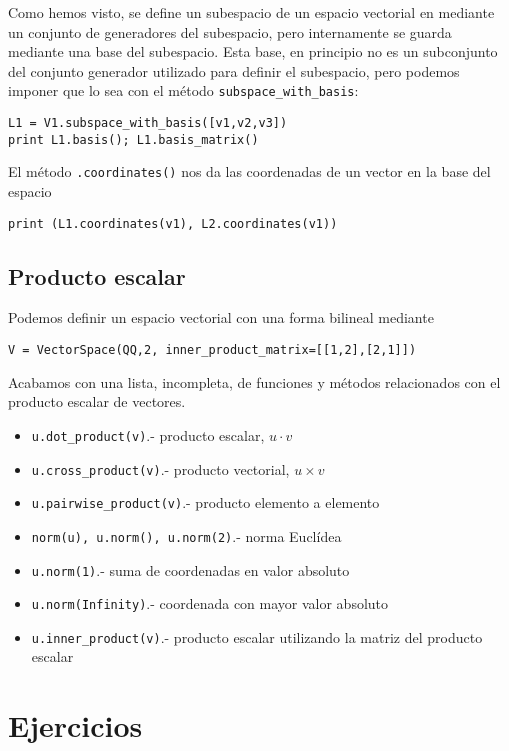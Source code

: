 Como hemos visto, se define un subespacio de un espacio vectorial en {\sage}
mediante un conjunto de generadores del subespacio,   pero internamente se
guarda   mediante una base del subespacio. Esta base, en principio no es un
subconjunto del conjunto generador utilizado para definir el subespacio, pero
podemos imponer que lo sea  con el método \lstinline|subspace_with_basis|:
\begin{lstlisting}
L1 = V1.subspace_with_basis([v1,v2,v3])
print L1.basis(); L1.basis_matrix()
\end{lstlisting}

El método \lstinline|.coordinates()| nos da las coordenadas de un vector en la
base del
espacio
\begin{lstlisting}
print (L1.coordinates(v1), L2.coordinates(v1))
\end{lstlisting}


\subsection{Producto escalar}

Podemos definir un espacio vectorial con una forma bilineal mediante 

\begin{lstlisting}
V = VectorSpace(QQ,2, inner_product_matrix=[[1,2],[2,1]])
\end{lstlisting}

Acabamos con una  lista, incompleta, de funciones y métodos relacionados con el
producto escalar de vectores.

\def\bfitem#1:{\item\lstinline|#1|.- }
\begin{itemize}
\renewcommand{\labelitemi}{$\circ$}
\bfitem u.dot_product(v): producto escalar, $u\cdot v$
\bfitem u.cross_product(v): producto vectorial, $u\times v$
\bfitem u.pairwise_product(v): producto elemento a elemento
\bfitem norm(u), u.norm(), u.norm(2): norma Euclídea
\bfitem u.norm(1): suma de coordenadas en valor absoluto
\bfitem u.norm(Infinity): coordenada con mayor valor absoluto
\bfitem u.inner_product(v): producto escalar utilizando la matriz del producto
escalar
\end{itemize}

\section{Ejercicios}


